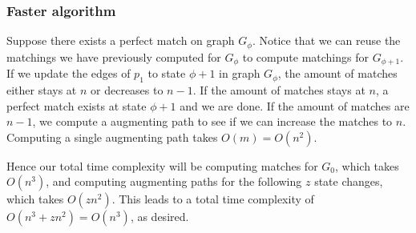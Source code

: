 \documentclass[11pt]{scrartcl}
\begin{document}
\subsubsection{
	Faster algorithm
}

Suppose there exists a perfect match on graph $G_\phi$.
Notice that we can reuse the matchings we have previously computed for $G_{\phi}$ to compute
matchings for $G_{\phi+1}$. If we update the edges of $p_1$ to state $\phi +1$ in graph $G_{\phi}$,
the amount of matches either stays at $n$ or decreases to $n-1$. If the amount of matches stays at $n$,
a perfect match exists at state $\phi + 1$ and we are done. If the amount of matches are $n-1$, we
compute a augmenting path to see if we can increase the matches to $n$. Computing a single
augmenting path takes $O(m) = O(n^2)$.

Hence our total time complexity will be computing matches for $G_0$, which takes $O(n^3)$,
and computing augmenting paths for the following $z$ state changes, which takes $O(zn^2)$.
This leads to a total time complexity of $O(n^3 + zn^2) = O(n^3)$, as desired.
\end{document}

